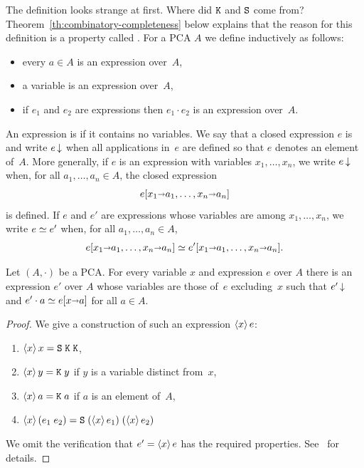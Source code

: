 \noindent
The definition looks strange at first. Where did $\mathtt{K}$ and $\mathtt{S}$
come from? Theorem~\ref{th:combinatory-completeness} below explains
that the reason for this definition is a property called
.
%
For a PCA $A$ we define  inductively as
follows:
%
\begin{itemize}
\item every $a \in A$ is an expression over~$A$,
\item a variable is an expression over~$A$,
\item if $e_1$ and $e_2$ are expressions then $e_1 \cdot e_2$ is an
  expression over~$A$.
\end{itemize}
%
An expression is  if it contains no variables. We say
that a closed expression $e$ is  and write $e\,{\downarrow}$
when all applications in~$e$ are defined so that $e$ denotes an
element of~$A$. More generally, if $e$ is an expression with variables
$x_1, \ldots, x_n$, we write $e\,{\downarrow}$ when, for all $a_1, \ldots,
a_n \in A$, the closed expression
%
\begin{equation*}
  e[x_1 {\shortrightarrow} a_1, \ldots, x_n {\shortrightarrow} a_n]
\end{equation*}
%
is defined. If $e$ and $e'$ are expressions whose variables are among
$x_1, \ldots, x_n$, we write $e \simeq e'$ when, for all $a_1, \ldots,
a_n \in A$,
%
\begin{equation*}
  e[x_1 {\shortrightarrow} a_1, \ldots, x_n {\shortrightarrow} a_n] \simeq
  e'[x_1 {\shortrightarrow} a_1, \ldots, x_n {\shortrightarrow} a_n].
\end{equation*}

\begin{theorem}
  \label{th:combinatory-completeness}
  Let $(A, {\cdot})$ be a PCA. For every variable $x$ and expression
  $e$ over $A$ there is an expression $e'$ over $A$ whose variables
  are those of~$e$ excluding~$x$ such that $e'\,{\downarrow}$ and $e'
  \cdot a \simeq e[x {\shortrightarrow} a]$ for all $a \in A$.
\end{theorem}

\begin{proof}
  We give a construction of such an expression $\langle x \rangle\,e$:
  \begin{enumerate}
  \item $\langle x \rangle\,x = \mathtt{S}\; \mathtt{K}\; \mathtt{K}$,
  \item $\langle x \rangle\,y = \mathtt{K}\; y$ if $y$ is a variable distinct from~$x$,
  \item $\langle x \rangle\,a = \mathtt{K}\; a$ if $a$ is an element of~$A$,
  \item $\langle x \rangle\,(e_1\; e_2) = \mathtt{S}\; (\langle x \rangle\,e_1)\; (\langle x \rangle\,e_2)$
  \end{enumerate}
  We omit the verification that $e' = \langle x \rangle\,e$ has the required
  properties. See~ for details.
\end{proof}

